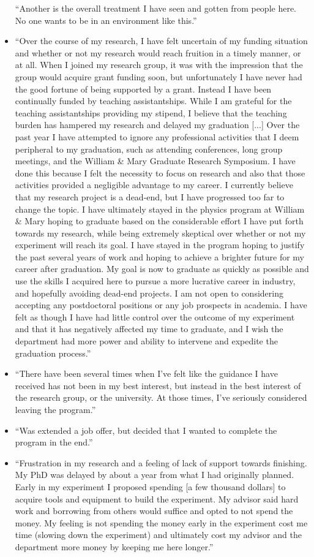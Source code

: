 \documentclass[oneside]{book}   %
\begin{document}
\begin{itemize}
“Another is the overall treatment I have seen and gotten from people here. No one wants to be in an environment like this.”
	\item “Over the course of my research, I have felt uncertain of my funding situation and whether or not my research would reach fruition in a timely manner, or at all. When I joined my research group, it was with the impression that the group would acquire grant funding soon, but unfortunately I have never had the good fortune of being supported by a grant. Instead I have been continually funded by teaching assistantships. While I am grateful for the teaching assistantships providing my stipend, I believe that the teaching burden has hampered my research and delayed my graduation [...] Over the past year I have attempted to ignore any professional activities that I deem peripheral to my graduation, such as attending conferences, long group meetings, and the William \& Mary Graduate Research Symposium. I have done this because I felt the necessity to focus on research and also that those activities provided a negligible advantage to my career. I currently believe that my research project is a dead-end, but I have progressed too far to change the topic. I have ultimately stayed in the physics program at William \& Mary hoping to graduate based on the considerable effort I have put forth towards my research, while being extremely skeptical over whether or not my experiment will reach its goal. I have stayed in the program hoping to justify the past several years of work and hoping to achieve a brighter future for my career after graduation. My goal is now to graduate as quickly as possible and use the skills I acquired here to pursue a more lucrative career in industry, and hopefully avoiding dead-end projects. I am not open to considering accepting any postdoctoral positions or any job prospects in academia. I have felt as though I have had little control over the outcome of my experiment and that it has negatively affected my time to graduate, and I wish the department had more power and ability to intervene and expedite the graduation process.”
	\item “There have been several times when I've felt like the guidance I have received has not been in my best interest, but instead in the best interest of the research group, or the university. At those times, I've seriously considered leaving the program.”
	\item “Was extended a job offer, but decided that I wanted to complete the program in the end.”
	\item “Frustration in my research and a feeling of lack of support towards finishing. My PhD was delayed by about a year from what I had originally planned. Early in my experiment I proposed spending [a few thousand dollars] to acquire tools and equipment to build the experiment. My advisor said hard work and borrowing from others would suffice and opted to not spend the money. My feeling is not spending the money early in the experiment cost me time (slowing down the experiment) and ultimately cost my advisor and the department more money by keeping me here longer.”

\end{itemize}
\end{document}

